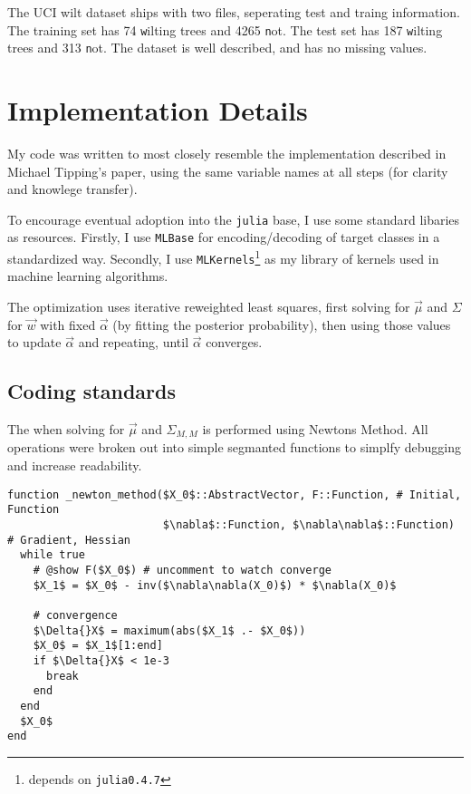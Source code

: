 \documentclass[11pt]{article} %
\def\irls{iterative reweighted least squares}
\def\julia{\texttt{julia}\xspace}
\def\juliaV{\julia \texttt{0.4.7}\xspace}
\def\MT{Michael Tipping\xspace}
\def\wilt{UCI wilt dataset\xspace}
\begin{document}
The \wilt ships with two files, seperating test and traing
information. The training set has 74 \texttt{w}ilting trees and
4265 \texttt{n}ot. The test set has 187 \texttt{w}ilting trees
and 313 \texttt{n}ot. The dataset is well described, and has no
missing values.

\section{Implementation Details}
My code was written to most closely resemble the implementation
described in \MT's paper, using the same variable names at all
steps (for clarity and knowlege transfer).

To encourage eventual adoption into the \julia base, I use some
standard libaries as resources. Firstly, I use \texttt{MLBase}
for encoding/decoding of target classes in a standardized way.
Secondly, I use \texttt{MLKernels}\footnote{depends on \juliaV}
as my library of kernels used in machine learning algorithms.

The optimization uses \irls, first solving for $\vec{\mu}$ and
$\Sigma$ for $\vec{w}$ with fixed $\vec{\alpha}$ (by fitting
the posterior probability), then using those values to update
$\vec{\alpha}$ and repeating, until $\vec{\alpha}$ converges.


\subsection{Coding standards}
The when solving for $\vec{\mu}$ and $\Sigma_{M,M}$ is performed
using Newtons Method. All operations were broken out into simple
segmanted functions to simplfy debugging and increase readability.

\begin{lstlisting}[mathescape=true]
function _newton_method($X_0$::AbstractVector, F::Function, # Initial, Function
                        $\nabla$::Function, $\nabla\nabla$::Function)          # Gradient, Hessian
  while true
    # @show F($X_0$) # uncomment to watch converge
    $X_1$ = $X_0$ - inv($\nabla\nabla(X_0)$) * $\nabla(X_0)$

    # convergence
    $\Delta{}X$ = maximum(abs($X_1$ .- $X_0$))
    $X_0$ = $X_1$[1:end]
    if $\Delta{}X$ < 1e-3
      break
    end
  end
  $X_0$
end
\end{lstlisting}
\end{document}
